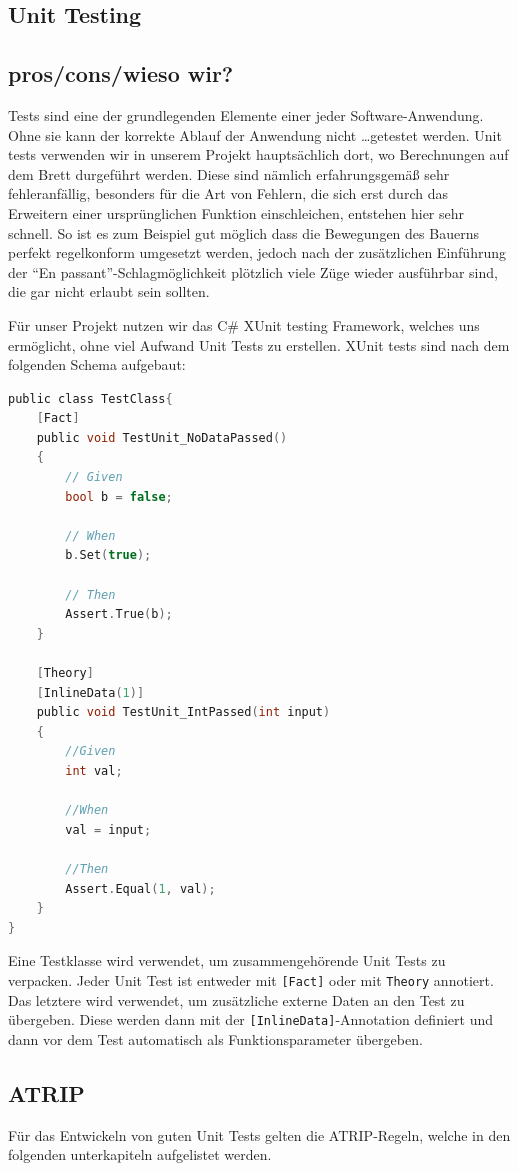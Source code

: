 \documentclass[
10pt, %
a4paper, %
oneside, %
headinclude,footinclude, %
BCOR5mm, %
]{scrartcl}
\begin{document}
\begin{onehalfspace}
\section{Unit Testing}
\subsection{pros/cons/wieso wir?}
Tests sind eine der grundlegenden Elemente einer jeder Software-Anwendung. Ohne sie kann der korrekte Ablauf der Anwendung nicht \dots getestet werden. Unit tests verwenden wir in unserem Projekt hauptsächlich dort, wo Berechnungen auf dem Brett durgeführt werden. Diese sind nämlich erfahrungsgemäß sehr fehleranfällig, besonders für die Art von Fehlern, die sich erst durch das Erweitern einer ursprünglichen Funktion einschleichen, entstehen hier sehr schnell. So ist es zum Beispiel gut möglich dass die Bewegungen des Bauerns perfekt regelkonform umgesetzt werden, jedoch nach der zusätzlichen Einführung der \enquote{En passant}-Schlagmöglichkeit plötzlich viele Züge wieder ausführbar sind, die gar nicht erlaubt sein sollten.

Für unser Projekt nutzen wir das C\# XUnit testing Framework, welches uns ermöglicht, ohne viel Aufwand Unit Tests zu erstellen.
XUnit tests sind nach dem folgenden Schema aufgebaut:
\begin{lstlisting}[language=c, style=mStyle]
public class TestClass{
	[Fact]
	public void TestUnit_NoDataPassed()
	{
		// Given
		bool b = false;

		// When
		b.Set(true);

		// Then
		Assert.True(b);
	}

	[Theory]
	[InlineData(1)]
	public void TestUnit_IntPassed(int input)
	{
		//Given
		int val;

		//When
		val = input;

		//Then
		Assert.Equal(1, val);
	}
}
\end{lstlisting}

Eine Testklasse wird verwendet, um zusammengehörende Unit Tests zu verpacken. Jeder Unit Test ist entweder mit \texttt{[Fact]} oder mit \texttt{Theory} annotiert. Das letztere wird verwendet, um zusätzliche externe Daten an den Test zu übergeben. Diese werden dann mit der \texttt{[InlineData]}-Annotation definiert und dann vor dem Test automatisch als Funktionsparameter übergeben.
\subsection{ATRIP}
Für das Entwickeln von guten Unit Tests gelten die ATRIP-Regeln, welche in den folgenden unterkapiteln aufgelistet werden.

\end{onehalfspace}
\end{document}
